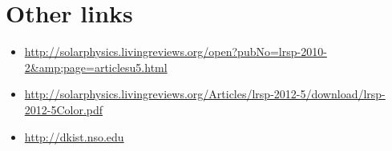 \documentclass{article}
\begin{document}
\section{Other links}
\begin{itemize}
    \item \url{http://solarphysics.livingreviews.org/open?pubNo=lrsp-2010-2&amp;page=articlesu5.html}
    \item \url{http://solarphysics.livingreviews.org/Articles/lrsp-2012-5/download/lrsp-2012-5Color.pdf}
    \item \url{http://dkist.nso.edu}
\end{itemize}

%
\end{document}
